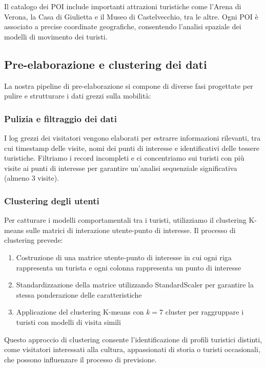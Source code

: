 \documentclass[12pt,a4paper]{article}
\begin{document}
Il catalogo dei POI include importanti attrazioni turistiche come l'Arena di Verona, la Casa di Giulietta e il Museo di Castelvecchio, tra le altre. Ogni POI è associato a precise coordinate geografiche, consentendo l'analisi spaziale dei modelli di movimento dei turisti.

\subsection{Pre-elaborazione e clustering dei dati}

La nostra pipeline di pre-elaborazione si compone di diverse fasi progettate per pulire e strutturare i dati grezzi sulla mobilità:

\subsubsection{Pulizia e filtraggio dei dati}
I log grezzi dei visitatori vengono elaborati per estrarre informazioni rilevanti, tra cui timestamp delle visite, nomi dei punti di interesse e identificativi delle tessere turistiche. Filtriamo i record incompleti e ci concentriamo sui turisti con più visite ai punti di interesse per garantire un'analisi sequenziale significativa (almeno 3 visite).

\subsubsection{Clustering degli utenti}
Per catturare i modelli comportamentali tra i turisti, utilizziamo il clustering K-means sulle matrici di interazione utente-punto di interesse. Il processo di clustering prevede:

\begin{enumerate}
\item Costruzione di una matrice utente-punto di interesse in cui ogni riga rappresenta un turista e ogni colonna rappresenta un punto di interesse
\item Standardizzazione della matrice utilizzando StandardScaler per garantire la stessa ponderazione delle caratteristiche
\item Applicazione del clustering K-means con $k=7$ cluster per raggruppare i turisti con modelli di visita simili
\end{enumerate}

Questo approccio di clustering consente l'identificazione di profili turistici distinti, come visitatori interessati alla cultura, appassionati di storia o turisti occasionali, che possono influenzare il processo di previsione.
\end{document}
